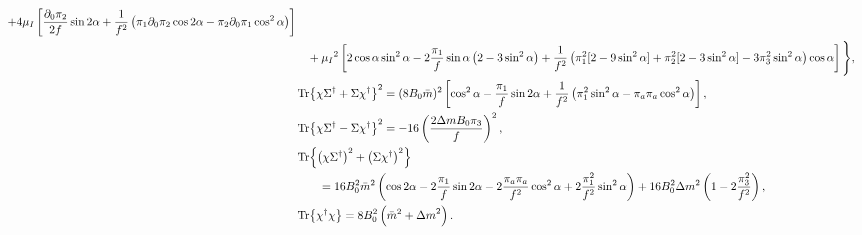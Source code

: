 \begin{align}
        + 4 \mu_I 
        \left[
            \frac{\partial_0 \pi_2}{2 f} \sin{2\alpha}
            + \frac{1}{f^2}
            \left(
                \pi_1 \partial_0 \pi_2 \cos{2\alpha}
                - \pi_2 \partial_0 \pi_1\cos^2{\alpha}
            \right)
        \right]\\\notag
        & \quad + \mu_I{}^2
        \left[
            2\cos{\alpha}\sin^2{\alpha} 
            - 2 \frac{\pi_1}{f} \sin{\alpha}
            \left(2 - 3\sin^2{\alpha}\right)
            + \frac{1}{f^2}
            \left(                
                \pi_1^2[2 - 9 \sin^2{\alpha}]
                + \pi_2^2 [2 - 3 \sin^2{\alpha}]
                - 3\pi_3^2\sin^2{\alpha}
            \right)
            \cos{\alpha}
        \right]
    \Bigg\}, \\
    \label{l3}
    & \Tr{\chi \Sigma^\dagger + \Sigma \chi^\dagger }^2
    = (8 B_0 \bar m)^2 
    \left[
        \cos^2{\alpha} 
        - \frac{\pi_1}{f} \sin{2\alpha}
        + \frac{1}{f^2}\left(\pi_1^2 \sin^2{\alpha} - \pi_a \pi_a \cos^2{\alpha}\right)
    \right], \\
    \label{l7}
    & \Tr{\chi \Sigma^\dagger - \Sigma \chi^\dagger }^2
     = - 16 \left( \frac{2 \Delta m B_0 \pi_3}{f} \right)^2, \\
    \notag
    & \Tr{\left(\chi \Sigma^\dagger\right)^2 + \left(\Sigma \chi^\dagger \right)^2}
    \\\label{h3}
    & \quad \quad = 16 B_0^2 \bar m^2
    \left(
        \cos{2\alpha} 
        - 2\frac{\pi_1}{f} \sin{2\alpha}
        - 2\frac{\pi_a \pi_a}{f^2} \cos^2{\alpha}
        + 2\frac{\pi_1^2}{f^2} \sin^2{\alpha}
    \right)
    + 16 B_0^2 \Delta m^2
    \left(
        1- 2\frac{ \pi_3^2}{f^2}
    \right)
    , \\
    \label{h2}
    & \Tr{\chi^\dagger \chi} = 8B_0^2\left( {\bar m}^2 + {\Delta m}^2\right).
\end{align}

\endgroup

